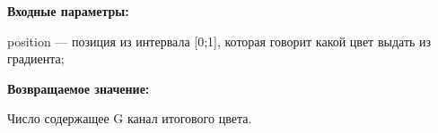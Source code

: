 \textbf{Входные параметры:}  

position --- позиция из интервала [0;1], которая говорит какой цвет выдать из градиента;

\textbf{Возвращаемое значение:}

Число содержащее G канал итогового цвета.
